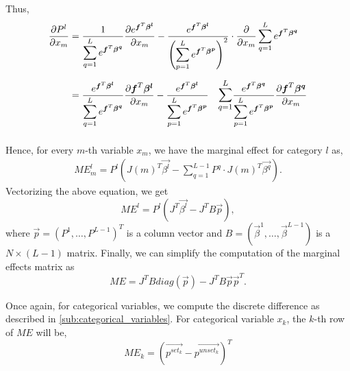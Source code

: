 Thus,
\begin{align*}
\displaystyle
\pder[P^l]{x_m} &=
        \frac{1}{\displaystyle \sum_{q=1}^{L} e^{\vec{f}^T \vec{\beta^q}}}
            \pder[e^{\vec{f}^T \vec{\beta^l}}]{x_m} -
        \frac{e^{\vec{f}^T \vec{\beta^l}} }
             {\displaystyle \left(\sum_{p=1}^{L} e^{\vec{f}^T \vec{\beta^p}}\right)^2} \cdot
            \pder{x_m} \displaystyle \sum_{q=1}^{L} e^{\vec{f}^T \vec{\beta^q}} \\[5pt]
        &= \frac{e^{\vec{f}^T \vec{\beta^l}}}
                {\displaystyle \sum_{q=1}^{L} e^{\vec{f}^T \vec{\beta^q}}} \pder[\vec{f}^T \vec{\beta^l}]{x_m} -
            \frac{ e^{\vec{f}^T \vec{\beta^l}} }
                 {\displaystyle \sum_{p=1}^{L} e^{\vec{f}^T \vec{\beta^p}} }
            \quad \displaystyle
                    \mathlarger{\sum_{q=1}^{L}}
                         \frac{ e^{\vec{f}^T \vec{\beta^q}} }
                              {\displaystyle \sum_{p=1}^{L} e^{\vec{f}^T \vec{\beta^p}}}
                         \pder[\vec{f}^T \vec{\beta^q}]{x_m} \\[5pt]
 \end{align*}

Hence, for every $m$-th variable $x_m$, we have the marginal effect for category
$l$ as,
\begin{gather*}
    \mathit{ME}_m^l = P^l\left(\displaystyle J(m)^T \vec{\beta^l} -
                      \sum_{q=1}^{L-1} P^q \cdot J(m)^T \vec{\beta^q}  \right).
\end{gather*}
Vectorizing the above equation, we get
$$
\mathit{ME}^l = P^l \left(\displaystyle J^T \vec{\beta^l} - J^T B \vec{p} \right),
$$
where $\vec{p} = (P^1, \ldots, P^{L-1})^T$ is a column vector and $B = (\vec{\beta}^1, \dots, \vec{\beta}^{L-1})$ is a $N \times (L-1)$ matrix.
Finally, we can simplify the computation of the marginal effects matrix as
$$
\mathit{ME} = J^T B \mathit{diag}(\vec{p}) - J^T B \vec{p} \vec{p}^T.
$$

Once again, for categorical variables, we compute the discrete difference
as described in \ref{sub:categorical_variables}.
For categorical variable $x_k$, the $k$-th row of $\mathit{ME}$ will be,
$$
    \mathit{ME_k} = \left( \vec{p^{set_k}} - \vec{p^{unset_k}} \right)^T
$$



